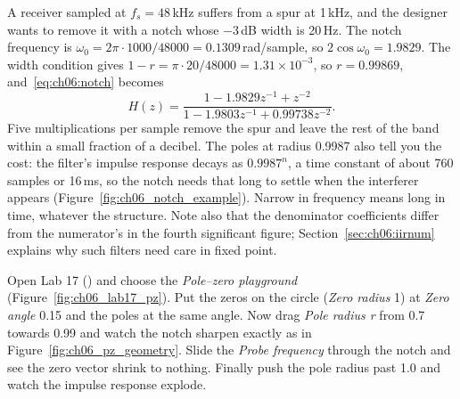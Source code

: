 
\begin{worked}
A receiver sampled at $f_s=48$\,kHz suffers from a spur at 1\,kHz, and the designer wants to remove
it with a notch whose $-3$\,dB width is 20\,Hz. The notch frequency is $\omega_0=2\pi\cdot1000/48000=
0.1309$\,rad/sample, so $2\cos\omega_0=1.9829$. The width condition gives
$1-r=\pi\cdot20/48000=1.31\times10^{-3}$, so $r=0.99869$, and~\eqref{eq:ch06:notch} becomes
\[
H(z)=\frac{1-1.9829z^{-1}+z^{-2}}{1-1.9803z^{-1}+0.99738z^{-2}}.
\]
Five multiplications per sample remove the spur and leave the rest of the band within a small
fraction of a decibel. The poles at radius 0.9987 also tell you the cost: the filter's impulse
response decays as $0.9987^n$, a time constant of about 760 samples or 16\,ms, so the notch
needs that long to settle when the interferer appears (Figure~\ref{fig:ch06_notch_example}). Narrow in frequency means long in time,
whatever the structure. Note also that the denominator coefficients differ from the numerator's
in the fourth significant figure; Section~\ref{sec:ch06:iirnum} explains why such filters need
care in fixed point.
\end{worked}


\begin{tryit}
Open Lab 17 () and choose the \emph{Pole--zero playground} (Figure~\ref{fig:ch06_lab17_pz}). Put the
zeros on the circle (\emph{Zero radius} 1) at \emph{Zero angle} 0.15 and the poles at the same
angle. Now drag \emph{Pole radius r} from 0.7 towards 0.99 and watch the notch sharpen exactly as
in Figure~\ref{fig:ch06_pz_geometry}. Slide the \emph{Probe frequency} through the notch and see the
zero vector shrink to nothing. Finally push the pole radius past 1.0 and watch the impulse response
explode.
\end{tryit}

